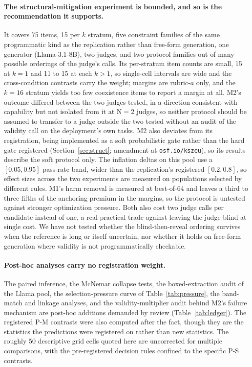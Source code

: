 \documentclass[11pt]{article}
\begin{document}
\paragraph{The structural-mitigation experiment is bounded, and so is the recommendation it supports.}
It covers 75 items, 15 per $k$ stratum, five constraint families of the same programmatic kind as the replication rather than free-form generation, one generator (Llama-3.1-8B), two judges, and two protocol families out of many possible orderings of the judge's calls.
Its per-stratum item counts are small, 15 at $k{=}1$ and 11 to 15 at each $k > 1$, so single-cell intervals are wide and the cross-condition contrasts carry the weight; margins are rubric-$a$ only, and the $k{=}16$ stratum yields too few coexistence items to report a margin at all.
M2's outcome differed between the two judges tested, in a direction consistent with capability but not isolated from it at N$=$2 judges, so neither protocol should be assumed to transfer to a judge outside the two tested without an audit of the validity call on the deployment's own tasks.
M2 also deviates from its registration, being implemented as a soft probabilistic gate rather than the hard gate registered (Section~\ref{sec:struct}; amendment at \texttt{osf.io/kszeu}), so its results describe the soft protocol only.
The inflation deltas on this pool use a $[0.05, 0.95]$ pass-rate band, wider than the replication's registered $[0.2, 0.8]$, so effect sizes across the two experiments are measured on populations selected by different rules.
M1's harm removal is measured at best-of-64 and leaves a third to three fifths of the anchoring premium in the margins, so the protocol is untested against stronger optimization pressure.
Both also cost two judge calls per candidate instead of one, a real practical trade against leaving the judge blind at single cost.
We have not tested whether the blind-then-reveal ordering survives when the reference is long or itself uncertain, nor whether it holds on free-form generation where validity is not programmatically checkable.

\paragraph{Post-hoc analyses carry no registration weight.}
The paired inference, the McNemar collapse tests, the boxed-extraction audit of the Llama pool, the selection-pressure curve of Table~\ref{tab:pressure}, the band-match and linkage analyses, and the validity-multiplier audit behind M2's failure mechanism are post-hoc additions demanded by review (Table~\ref{tab:ledger}).
The registered P-M contrasts were also computed after the fact, though they are the statistics the predictions were registered on rather than new statistics.
The roughly 50 descriptive grid cells quoted here are uncorrected for multiple comparisons, with the pre-registered decision rules confined to the specific P-S contrasts.
\end{document}
